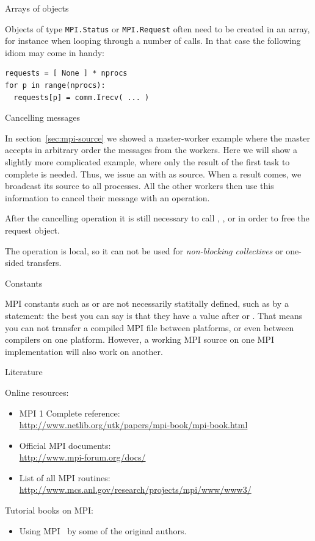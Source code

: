  {Arrays of objects}

Objects of type \lstinline{MPI.Status} or \lstinline{MPI.Request} often need to be created
in an array, for instance when looping through a number of  calls.
In that case the following idiom may come in handy:

\lstset{language=Python} %
\begin{lstlisting}
requests = [ None ] * nprocs
for p in range(nprocs):
  requests[p] = comm.Irecv( ... )
\end{lstlisting}
\lstset{language=C} %


 {Cancelling messages}

In section~\ref{sec:mpi-source} we showed a master-worker example where the 
master accepts in arbitrary order the messages from the workers.
Here we will show a slightly
more complicated example, where only the result of the first task to
complete is needed. Thus, we issue an 
with  as source.  When a result comes, we
broadcast its source to all processes.  All the other workers then use
this information to cancel their message with
an  operation.
%

After the cancelling operation it is still necessary to call
, , or
 in order to free the request object.

The  operation is local, so it can not be
used for \emph{non-blocking
  collectives} or one-sided transfers.

 {Constants}

MPI constants such as  or  are not
necessarily statitally defined, such as by a  statement:
the best you can say is that they have a value after
 or .
That means you can not transfer a compiled MPI file between
platforms, or even between compilers on one platform.
However, a working MPI source on one MPI implementation
will also work on another.

 {Literature}

Online resources:
\begin{itemize}
\item MPI 1 Complete reference:\\ \url{http://www.netlib.org/utk/papers/mpi-book/mpi-book.html}
\item Official MPI documents:\\ \url{http://www.mpi-forum.org/docs/}
\item List of all MPI routines:\\ \url{http://www.mcs.anl.gov/research/projects/mpi/www/www3/}
\end{itemize}

Tutorial books on MPI:
\begin{itemize}
\item Using MPI~\cite{Gropp:UsingMPI1} by some of the original authors.
\end{itemize}

\endinput

Examples: 
compute pi
mandelbrot set
